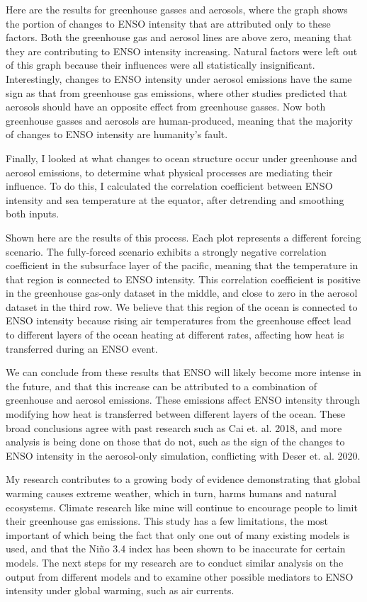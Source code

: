 \documentclass{basic}
\begin{document}
Here are the results for greenhouse gasses and aerosols, where the graph shows the portion of changes to ENSO intensity that are attributed only to these factors. Both the greenhouse gas and aerosol lines are above zero, meaning that they are contributing to ENSO intensity increasing. Natural factors were left out of this graph because their influences were all statistically insignificant. Interestingly, changes to ENSO intensity under aerosol emissions have the same sign as that from greenhouse gas emissions, where other studies predicted that aerosols should have an opposite effect from greenhouse gasses. Now both greenhouse gasses and aerosols are human-produced, meaning that the majority of changes to ENSO intensity are humanity's fault.

Finally, I looked at what changes to ocean structure occur under greenhouse and aerosol emissions, to determine what physical processes are mediating their influence. To do this, I calculated the correlation coefficient between ENSO intensity and sea temperature at the equator, after detrending and smoothing both inputs.

Shown here are the results of this process. Each plot represents a different forcing scenario. The fully-forced scenario exhibits a strongly negative correlation coefficient in the subsurface layer of the pacific, meaning that the temperature in that region is connected to ENSO intensity. This correlation coefficient is positive in the greenhouse gas-only dataset in the middle, and close to zero in the aerosol dataset in the third row. We believe that this region of the ocean is connected to ENSO intensity because rising air temperatures from the greenhouse effect lead to different layers of the ocean heating at different rates, affecting how heat is transferred during an ENSO event.

We can conclude from these results that ENSO will likely become more intense in the future, and that this increase can be attributed to a combination of greenhouse and aerosol emissions. These emissions affect ENSO intensity through modifying how heat is transferred between different layers of the ocean. These broad conclusions agree with past research such as Cai et. al. 2018, and more analysis is being done on those that do not, such as the sign of the changes to ENSO intensity in the aerosol-only simulation, conflicting with Deser et. al. 2020.

My research contributes to a growing body of evidence demonstrating that global warming causes extreme weather, which in turn, harms humans and natural ecosystems. Climate research like mine will continue to encourage people to limit their greenhouse gas emissions. This study has a few limitations, the most important of which being the fact that only one out of many existing models is used, and that the Niño 3.4 index has been shown to be inaccurate for certain models. The next steps for my research are to conduct similar analysis on the output from different models and to examine other possible mediators to ENSO intensity under global warming, such as air currents.
\end{document}
